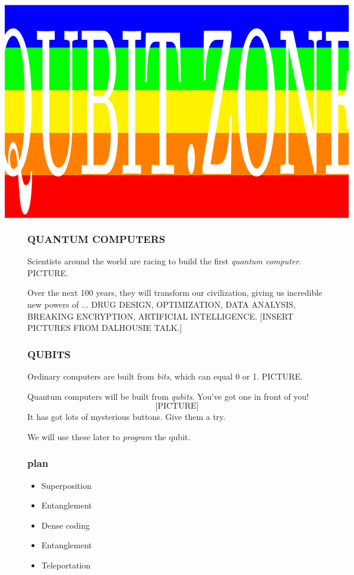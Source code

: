 \documentclass[aspectratio=169]{beamer}
\begin{document}
\begin{frame}

\vspace{-20pt}
\[
\hspace{-2cm}
\begin{tikzpicture}[xscale=1.2, yscale=1.8]
\foreach \x/\y in {0/red,1/orange,2/yellow,3/green,4/blue} {
  \path [fill=\y] (0,\x) rectangle +(\textwidth,1);
}
\path [use as bounding box] (current bounding box.south west) rectangle (current bounding box.north east);
\node [scale=2.5, white, yscale=4.04] at (0.5*\textwidth,2.23) {\Huge\bf QUBIT.ZONE};
\end{tikzpicture}
\hspace{-2cm}
\]

\end{frame}




\begin{frame}
\frametitle{QUANTUM COMPUTERS}

Scientists around the world are racing to build the first \textit{quantum computer}. PICTURE.

\vspace{15pt}
Over the next 100 years, they will transform our civilization, giving us incredible new powers of ... DRUG DESIGN, OPTIMIZATION, DATA ANALYSIS, BREAKING ENCRYPTION, ARTIFICIAL INTELLIGENCE. [INSERT PICTURES FROM DALHOUSIE TALK.]

\end{frame}

\begin{frame}
\frametitle{QUBITS}

Ordinary computers are built from \textit{bits}, which can equal 0 or 1. PICTURE.

\vspace{10pt}
Quantum computers will be built from \textit{qubits}. You've got one in front of you!
\[
\text{[PICTURE]}
\]
It has got lots of mysterious buttons. Give them a try.

\vspace{10pt}
We will use these later to \textit{program} the qubit.

\end{frame}

\begin{frame}
\frametitle{plan}

\begin{itemize}
\item Superposition
\item Entanglement
\item Dense coding
\item Entanglement
\item Teleportation
\end{itemize}



\end{frame}
\end{document}

